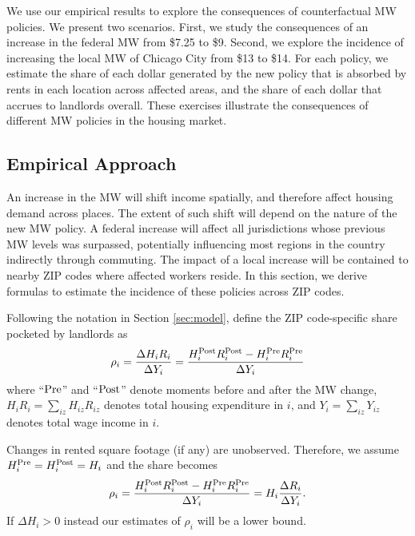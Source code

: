 
We use our empirical results to explore the consequences of counterfactual 
MW policies.
We present two scenarios.
First, we study the consequences of an increase in the federal MW 
from \$7.25 to \$9.
Second, we explore the incidence of increasing the local MW of Chicago City 
from \$13 to \$14.
For each policy, we estimate the share of each dollar generated by the new 
policy that is absorbed by rents in each location across affected areas, and 
the share of each dollar that accrues to landlords overall.
These exercises illustrate the consequences of different MW policies in the 
housing market.

\subsection{Empirical Approach}\label{sec:emp_cf}

An increase in the MW will shift income spatially, and therefore affect housing 
demand across places.
The extent of such shift will depend on the nature of the new MW policy.
A federal increase will affect all jurisdictions whose previous MW levels was 
surpassed, potentially influencing most regions in the country indirectly 
through commuting.
The impact of a local increase will be contained to nearby ZIP codes where 
affected workers reside.
In this section, we derive formulas to estimate the incidence of these 
policies across ZIP codes.

Following the notation in Section \ref{sec:model}, define the ZIP code-specific 
share pocketed by landlords as
\begin{equation*}
    \rho_i = \frac{\Delta H_i R_i}{\Delta Y_i} 
           = \frac{H^{\text{Post}}_i R^{\text{Post}}_i - H^{\text{Pre}}_i R^{\text{Pre}}_i}{\Delta Y_i} 
\end{equation*}
where
``$\text{Pre}$'' and ``$\text{Post}$'' denote moments before and after the MW change,
$H_i R_i = \sum_{iz} H_{iz} R_{iz}$ denotes total housing expenditure in $i$, and
$Y_i = \sum_{iz} Y_{iz}$ denotes total wage income in $i$.

Changes in rented square footage (if any) are unobserved.
Therefore, we assume $H^{\text{Pre}}_i = H^{\text{Post}}_i = H_i$ and the share becomes
\begin{equation}\label{eq:share_pocketed}
    \rho_i = \frac{H^{\text{Post}}_i R^{\text{Post}}_i - H^{\text{Pre}}_i R^{\text{Pre}}_i}{\Delta Y_i} = 
                H_i \frac{\Delta R_i}{\Delta Y_i} .
\end{equation}
If $\Delta H_i > 0$ instead our estimates of $\rho_i$ will be a lower bound.

